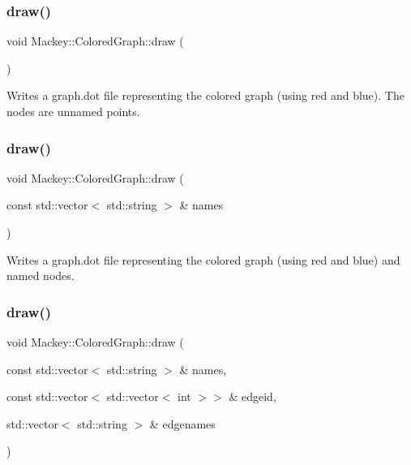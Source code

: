 \subsubsection{\texorpdfstring{draw()}{draw()}\hspace{0.1cm}{\footnotesize\ttfamily [1/3]}}
{\footnotesize\ttfamily void Mackey\+::\+Colored\+Graph\+::draw (\begin{DoxyParamCaption}{ }\end{DoxyParamCaption})}



Writes a graph.\+dot file representing the colored graph (using red and blue). The nodes are unnamed points. 

\mbox{\label{classMackey_1_1ColoredGraph_a912a6e5cb94386d9ff6510e968b41e7d}} 
\subsubsection{\texorpdfstring{draw()}{draw()}\hspace{0.1cm}{\footnotesize\ttfamily [2/3]}}
{\footnotesize\ttfamily void Mackey\+::\+Colored\+Graph\+::draw (\begin{DoxyParamCaption}\item[{const std\+::vector$<$ std\+::string $>$ \&}]{names }\end{DoxyParamCaption})}



Writes a graph.\+dot file representing the colored graph (using red and blue) and named nodes. 

\mbox{\label{classMackey_1_1ColoredGraph_a88cde9e3cc3bfb72409142ac6705b474}} 
\subsubsection{\texorpdfstring{draw()}{draw()}\hspace{0.1cm}{\footnotesize\ttfamily [3/3]}}
{\footnotesize\ttfamily void Mackey\+::\+Colored\+Graph\+::draw (\begin{DoxyParamCaption}\item[{const std\+::vector$<$ std\+::string $>$ \&}]{names,  }\item[{const std\+::vector$<$ std\+::vector$<$ int $>$$>$ \&}]{edgeid,  }\item[{std\+::vector$<$ std\+::string $>$ \&}]{edgenames }\end{DoxyParamCaption})}



